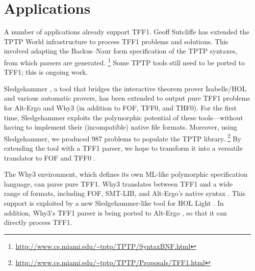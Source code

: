 \section{Applications}
\label{sec_apps}

A number of applications already support TFF1. Geoff
Sutcliffe has extended the TPTP World infrastructure to process TFF1 problems
and solutions. This involved adapting the Backus--Naur form specification of the
TPTP syntaxes, from which parsers are generated.%
\footnote{\url{http://www.cs.miami.edu/~tptp/TPTP/SyntaxBNF.html}}
Some TPTP tools still need to be ported to TFF1; this is ongoing work.


Sledgehammer \cite{paulson-blanchette-2010}, a tool that bridges the interactive
theorem prover Isabelle\slash HOL and various automatic provers, has been
extended to output pure TFF1 problems for Alt-Ergo and Why3
(in addition to FOF, TFF0, and THF0). For the first time, Sledgehammer
exploits the polymorphic potential of these tools---without having
to implement their (incompatible) native file formats.
Moreover, using Sledgehammer, we produced 987 problems to populate the TPTP
library.%
\footnote{\url{http://www.cs.miami.edu/~tptp/TPTP/Proposals/TFF1.html}}
By extending the tool with a TFF1 parser,
we hope to transform it into a versatile translator to FOF and
TFF0 \cite{blanchette-et-al-2013-types}.

The Why3 \cite{bobot-et-al-2011} environment, which defines its own ML-like
polymorphic specification language, can parse pure TFF1. Why3 translates
between TFF1 and a wide range of
formats, including FOF, SMT-LIB, and
Alt-Ergo's native syntax \cite{couchot-lescuyer-2007,bobot-paskevich-2011}.
This support is exploited by a new Sledgehammer-like tool for HOL Light
\cite{kaliszyk-urban-2013}.
In addition, Why3's TFF1 parser is being ported to
Alt-Ergo \cite{bobot-et-al-2008}, so that it can directly process TFF1. %



